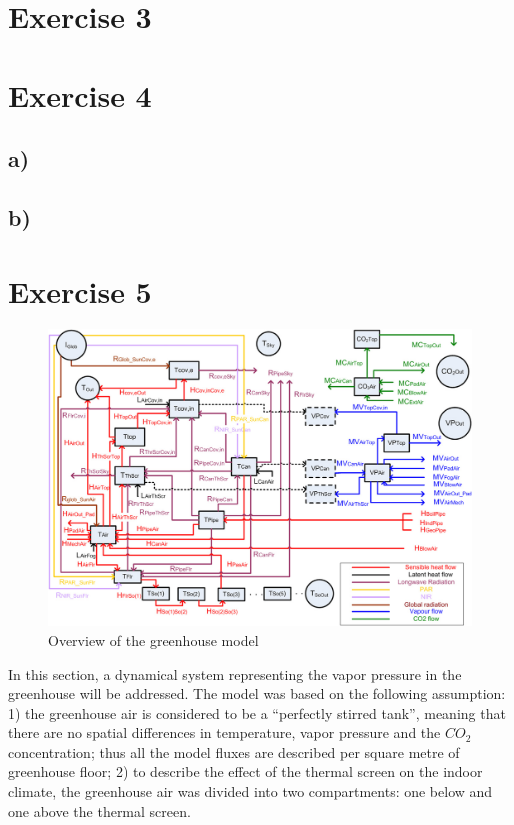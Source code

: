 \documentclass[a4paper]{article}
\begin{document}
\section{Exercise 3}


\section{Exercise 4}
\subsection{a)}

\subsection{b)}


\section{Exercise 5}
\begin{figure}[H]
  \centering
  \includegraphics[width=\textwidth]{overview}
  \caption{Overview of the greenhouse model}\label{fig:overview}
\end{figure}

In this section, a dynamical system representing the vapor pressure in the greenhouse will be addressed.
The model was based on the following assumption:
1) the greenhouse air is considered to be a ``perfectly stirred tank'', meaning that there are no spatial differences in temperature, vapor pressure and the \(CO_2\) concentration; thus all the model fluxes are described per square metre of greenhouse floor;
2) to describe the effect of the thermal screen on the indoor climate, the greenhouse air was divided into two compartments: one below and one above the thermal screen.
\end{document}

